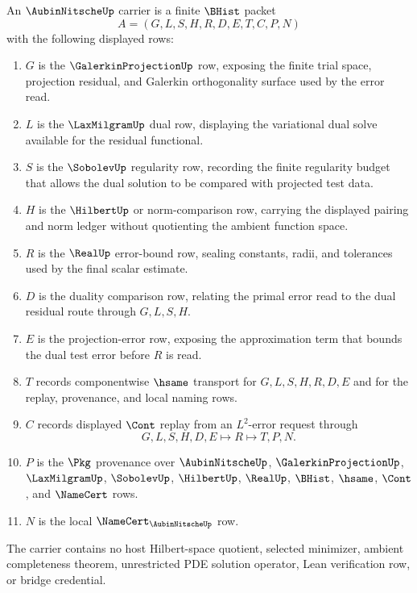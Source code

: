 \begin{definition}
\label{def:aubin-nitsche-carrier}
An $\AubinNitscheUp$ carrier is a finite $\BHist$ packet
$$
A=(G,L,S,H,R,D,E,T,C,P,N)
$$
with the following displayed rows:
\begin{enumerate}
\item $G$ is the $\GalerkinProjectionUp$ row, exposing the finite trial space, projection residual, and Galerkin orthogonality surface used by the error read.
\item $L$ is the $\LaxMilgramUp$ dual row, displaying the variational dual solve available for the residual functional.
\item $S$ is the $\SobolevUp$ regularity row, recording the finite regularity budget that allows the dual solution to be compared with projected test data.
\item $H$ is the $\HilbertUp$ or norm-comparison row, carrying the displayed pairing and norm ledger without quotienting the ambient function space.
\item $R$ is the $\RealUp$ error-bound row, sealing constants, radii, and tolerances used by the final scalar estimate.
\item $D$ is the duality comparison row, relating the primal error read to the dual residual route through $G,L,S,H$.
\item $E$ is the projection-error row, exposing the approximation term that bounds the dual test error before $R$ is read.
\item $T$ records componentwise $\hsame$ transport for $G,L,S,H,R,D,E$ and for the replay, provenance, and local naming rows.
\item $C$ records displayed $\Cont$ replay from an $L^2$-error request through
$$
G,L,S,H,D,E \longmapsto R \longmapsto T,P,N .
$$
\item $P$ is the $\Pkg$ provenance over $\AubinNitscheUp$, $\GalerkinProjectionUp$, $\LaxMilgramUp$, $\SobolevUp$, $\HilbertUp$, $\RealUp$, $\BHist$, $\hsame$, $\Cont$, and $\NameCert$ rows.
\item $N$ is the local $\NameCert_{\AubinNitscheUp}$ row.
\end{enumerate}
The carrier contains no host Hilbert-space quotient, selected minimizer, ambient completeness theorem, unrestricted PDE solution operator, Lean verification row, or bridge credential.
\end{definition}

